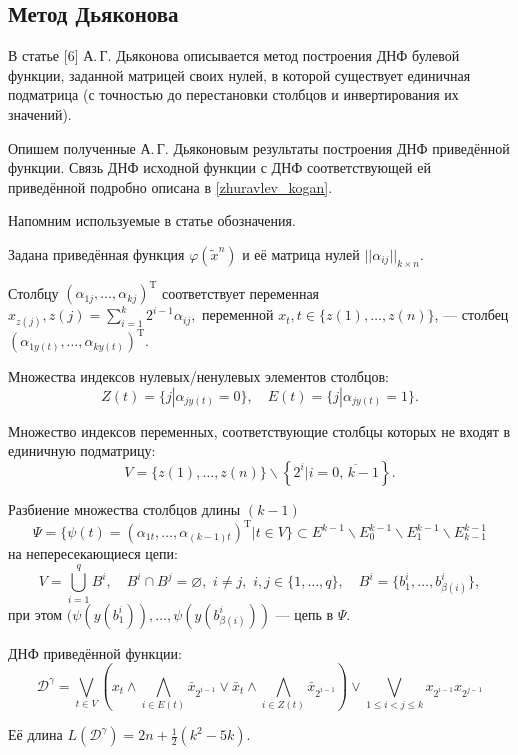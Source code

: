 \documentclass[12pt,a4paper,oneside,fleqn,leqno]{article}
\theoremstyle{definition}
\begin{document}
		\subsection{Метод Дьяконова} \label{dj}
			В статье [6] А.\,Г. Дьяконова описывается метод построения ДНФ булевой функции, заданной матрицей своих нулей, в которой существует единичная подматрица (с точностью до перестановки столбцов и инвертирования их значений).\par
			Опишем полученные А.\,Г. Дьяконовым результаты построения ДНФ приведённой функции. Связь ДНФ исходной функции с ДНФ соответствующей ей приведённой подробно описана в \ref{zhuravlev_kogan}.\par
			Напомним используемые в статье обозначения.\par
			Задана приведённая функция $\varphi(\tilde x^n)$ и её матрица нулей $||\alpha_{ij}||_{k \times n}.$\par
			Столбцу $(\alpha_{1j}, \ldots, \alpha_{kj})^{\text{T}}$ соответствует переменная $x_{z(j)}, z(j) = \sum\limits_{i = 1}^k 2^{i - 1}\alpha_{ij},$ переменной $x_t, t\in \{z(1),\ldots,z(n)\}$, --- столбец $(\alpha_{1y(t)}, \ldots, \alpha_{ky(t)})^{\text{T}}.$\par
			Множества индексов нулевых/ненулевых элементов столбцов:
			$$
				Z(t) = \{j | \alpha_{jy(t)} = 0\},\quad E(t) = \{j | \alpha_{jy(t)} = 1\}.
			$$\par
			Множество индексов переменных, соответствующие столбцы которых не входят в единичную подматрицу:
			$$
				V = \{z(1), \ldots, z(n)\} \backslash \left\{2^i | i = \overline{0,\,k - 1}\right\}.
			$$\par
			Разбиение множества столбцов длины $(k - 1)$
			$$
				\Psi = \{\psi(t) = (\alpha_{1t}, \ldots, \alpha_{(k - 1) t})^{\text{T}} | t \in V\} \subset E^{k - 1}\backslash E^{k - 1}_0\backslash E^{k - 1}_1 \backslash E^{k - 1}_{k - 1}
			$$
			 на непересекающиеся цепи:
			$$
				V = \bigcup_{i = 1}^qB^i,\quad B^i\cap B^j = \varnothing,\,\,i \neq j,\,\,i,j \in \{1,\ldots,q\},\quad B^i = \{b^i_1,\ldots, b^i_{\beta(i)} \},
			$$
			при этом $(\psi(y(b^i_1)), \ldots, \psi(y(b^i_{\beta(i)}))$ --- цепь в $\Psi.$\par
			ДНФ приведённой функции:
			$$
				\mathcal{D}^{\gamma} = \bigvee_{t  \in V} \left(x_t \wedge \bigwedge_{i \in E(t)} \bar{x}_{2^{i - 1}} \vee \bar{x}_t \wedge \bigwedge_{i \in Z(t)} \bar{x}_{2^{i - 1}}\right) \vee \bigvee_{1 \leqslant i < j \leqslant k} x_{2^{i - 1}} x_{2^{j - 1}}
			$$\par
			Её длина $L(\mathcal{D}^{\gamma}) = 2n + \frac{1}{2}(k^2 - 5k).$\par
			
\end{document}
